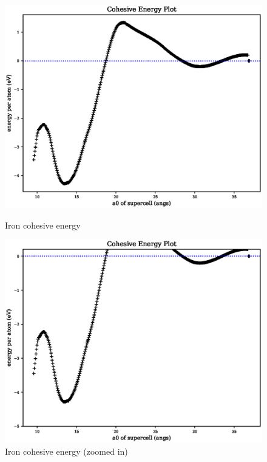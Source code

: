 \begin{figure}[ht] 
  \begin{minipage}[b]{0.4\linewidth}
    \centering
    \includegraphics[width=.9\linewidth]{chapters/results_potential_fitting/pot_fepd_fcc_2/fe_cohesive_energy.eps} 
    \caption{Iron cohesive energy}  
    \label{fig:fev2cohesive}
  \end{minipage}%
  \begin{minipage}[b]{0.4\linewidth}
    \centering
    \includegraphics[width=.9\linewidth]{chapters/results_potential_fitting/pot_fepd_fcc_2/fe_cohesive_energy_zoom.eps} 
    \caption{Iron cohesive energy (zoomed in)}  
    \label{fig:fev2cohesivezoom}
  \end{minipage}%
\end{figure}

